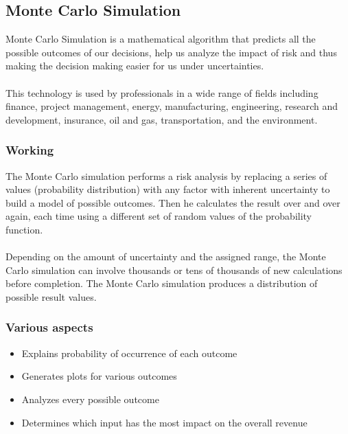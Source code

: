 \documentclass[12pt,two column]{article}
\begin{document}
\bigskip
\subsection{Monte Carlo Simulation}
Monte Carlo Simulation is a mathematical algorithm that predicts all the possible outcomes of our decisions, help us analyze the impact of risk and thus making the decision making easier for us under uncertainties.\\ \\
This technology is used by professionals in a wide range of fields including finance, project management, energy, manufacturing, engineering, research and development, insurance, oil and gas, transportation, and the environment.\\ 
\subsubsection{Working}
The Monte Carlo simulation performs a risk analysis by replacing a series of values (probability distribution) with any factor with inherent uncertainty to build a model of possible outcomes. Then he calculates the result over and over again, each time using a different set of random values of the probability function.\\ \\ Depending on the amount of uncertainty and the assigned range, the Monte Carlo simulation can involve thousands or tens of thousands of new calculations before completion. The Monte Carlo simulation produces a distribution of possible result values.

\subsubsection{Various aspects}
\begin{itemize}
      \item Explains probability of occurrence of each outcome
      \item Generates plots for various outcomes
      \item Analyzes every possible outcome
      \item Determines which input has the most impact on the overall revenue
\end{itemize}
\end{document}
